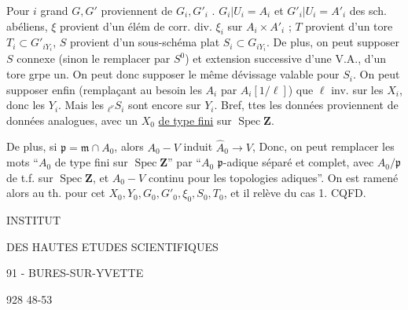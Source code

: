 Pour $i$ grand $G,G'$ proviennent de $G_i,G'_i$ .
$G_i|U_i=A_i$ et $G'_i|U_i=A'_i$ des sch. abéliens, $\xi$ provient d'un élém de corr. div. $\xi_i$ sur $A_i\times A'_i$ ; $T$ provient d'un tore $T_i\subset G'_{iY_i}$, $S$ provient d'un sous-schéma plat $S_i\subset G_{iY_i}$.
De plus,   on peut  supposer $S$ connexe  (sinon le remplacer par $S^0$) et  extension  successive d'une V.A., d'un tore  grpe un. On peut donc supposer le même dévissage valable pour $S_i$.
On peut supposer enfin (remplaçant au besoin les $A_i$ par $A_i[1/\ell]$) que $\ell$ inv. sur les $X_i$, donc les $Y_i$. Mais les ${}_{\ell^\nu}S_i$ sont encore  sur $Y_i$. Bref, ttes les données proviennent de données analogues, avec un  $X_0$  \uline{de type fini} sur $\operatorname{Spec}\mathbf Z$.

De plus, si $\mathfrak p=\mathfrak m\cap A_0$, alors $A_0\mathbin{-}V$ induit $\widehat A_0\longrightarrow V$,  Donc, on peut remplacer les mots ``$A_0$ de type fini sur $\operatorname{Spec}\mathbf Z$'' par ``$A_0$ $\mathfrak p$-adique séparé et complet, avec $A_0/\mathfrak p$ de t.f. sur $\operatorname{Spec}\mathbf Z$, et $A_0\mathbin{-}V$ continu pour les topologies adiques''. On est ramené alors au th. pour cet $X_0,Y_0,G_0,G'_0,\xi_0,S_0,T_0$, et il relève du cas 1.
\hfill CQFD.

INSTITUT

DES HAUTES ETUDES SCIENTIFIQUES

91 - BURES-SUR-YVETTE

928 48-53

